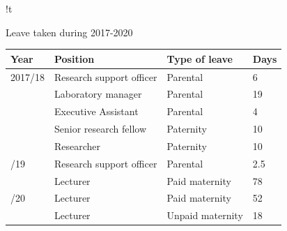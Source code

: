 \begin{tabbox}[11cm]{!t}
\caption{Leave taken during 2017-2020}
\label{tab:culture:leave}
\footnotesize 

    
\begin{tabular}{p{1.4cm}
                !{\qquad}
                p{4cm}
                !{\qquad}
                p{3cm}
                R{1cm}}
    
\toprule 
Year  & Position & Type of leave & Days \\
\midrule
    
2017/18 & Research support officer & Parental & 6\\
& Laboratory manager & Parental & 19 \\
& Executive Assistant & Parental & 4\\
& Senior research fellow & Paternity & 10 \\
& Researcher & Paternity & 10\\
/19 & Research support officer & Parental & 2.5\\
& Lecturer & Paid maternity & 78 \\
/20 & Lecturer & Paid maternity & 52\\ 
& Lecturer & Unpaid maternity & 18\\
    
\bottomrule      
         
\end{tabular}
    
\end{tabbox}